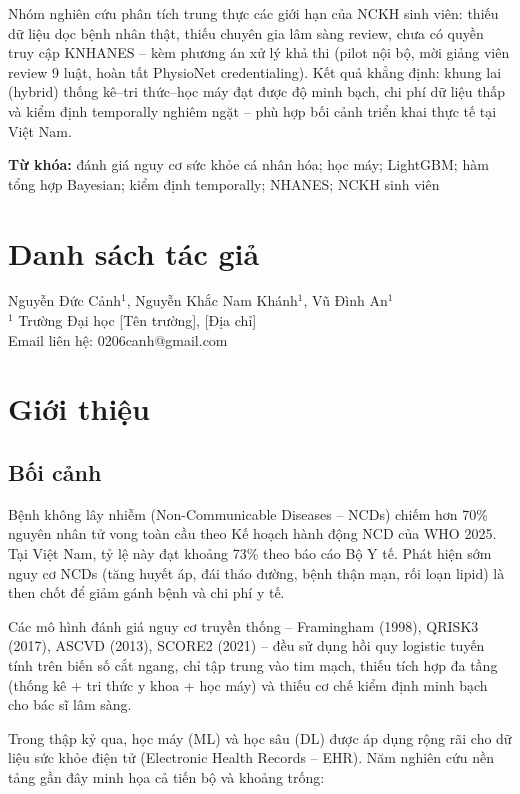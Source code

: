 \documentclass[13pt,a4paper]{article}
\begin{document}
Nhóm nghiên cứu phân tích trung thực các giới hạn của NCKH sinh viên: thiếu dữ liệu dọc bệnh nhân thật, thiếu chuyên gia lâm sàng review, chưa có quyền truy cập KNHANES -- kèm phương án xử lý khả thi (pilot nội bộ, mời giảng viên review 9 luật, hoàn tất PhysioNet credentialing). Kết quả khẳng định: khung lai (hybrid) thống kê--tri thức--học máy đạt được độ minh bạch, chi phí dữ liệu thấp và kiểm định temporally nghiêm ngặt -- phù hợp bối cảnh triển khai thực tế tại Việt Nam.

\textbf{Từ khóa:} đánh giá nguy cơ sức khỏe cá nhân hóa; học máy; LightGBM; hàm tổng hợp Bayesian; kiểm định temporally; NHANES; NCKH sinh viên

\vspace{1cm}

\section*{Danh sách tác giả}

Nguyễn Đức Cảnh$^1$, Nguyễn Khắc Nam Khánh$^1$, Vũ Đình An$^1$ \\
$^1$ Trường Đại học [Tên trường], [Địa chỉ] \\
Email liên hệ: 0206canh@gmail.com

\vspace{1cm}

\section{Giới thiệu}

\subsection{Bối cảnh}

Bệnh không lây nhiễm (Non-Communicable Diseases -- NCDs) chiếm hơn 70\% nguyên nhân tử vong toàn cầu theo Kế hoạch hành động NCD của WHO 2025. Tại Việt Nam, tỷ lệ này đạt khoảng 73\% theo báo cáo Bộ Y tế. Phát hiện sớm nguy cơ NCDs (tăng huyết áp, đái tháo đường, bệnh thận mạn, rối loạn lipid) là then chốt để giảm gánh bệnh và chi phí y tế.

Các mô hình đánh giá nguy cơ truyền thống -- Framingham (1998), QRISK3 (2017), ASCVD (2013), SCORE2 (2021) -- đều sử dụng hồi quy logistic tuyến tính trên biến số cắt ngang, chỉ tập trung vào tim mạch, thiếu tích hợp đa tầng (thống kê + tri thức y khoa + học máy) và thiếu cơ chế kiểm định minh bạch cho bác sĩ lâm sàng.

Trong thập kỷ qua, học máy (ML) và học sâu (DL) được áp dụng rộng rãi cho dữ liệu sức khỏe điện tử (Electronic Health Records -- EHR). Năm nghiên cứu nền tảng gần đây minh họa cả tiến bộ và khoảng trống:
\end{document}
